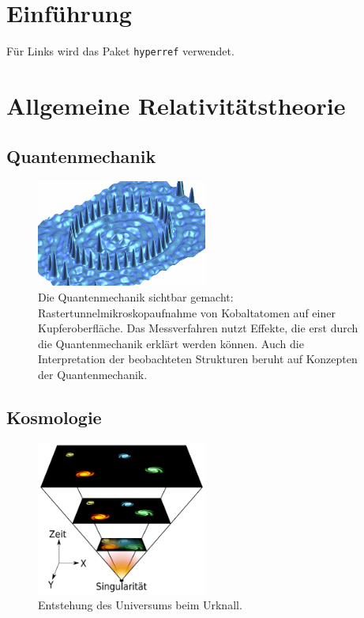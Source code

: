 \documentclass[a4paper, twoside, 10pt]{article}
\begin{document}
\section{Einführung}

F\"ur Links wird das Paket \texttt{hyperref} \cite{hyperref-doc} verwendet.

\lipsum

\section{Allgemeine Relativit\"atstheorie}

\lipsum

\subsection{Quantenmechanik}

\begin{figure}[htp]
    \centering
    \includegraphics[width=0.5\textwidth]{fig/co-ellipse.png}
    \caption{Die Quantenmechanik sichtbar gemacht: Rastertunnelmikroskopaufnahme von Kobaltatomen auf einer Kupferoberfläche. Das Messverfahren nutzt Effekte, die erst durch die Quantenmechanik erklärt werden können. Auch die Interpretation der beobachteten Strukturen beruht auf Konzepten der Quantenmechanik. \cite{fig-co-ellipse}}
    \label{fig:co-ellipse}
\end{figure}

\lipsum

\subsection{Kosmologie}

\begin{figure}[htp]
    \centering
    \includegraphics[width=0.5\textwidth]{fig/universe-expansion-de.png}
    \caption{Entstehung des Universums beim Urknall. \cite{fig-universe-expansion}}
    \label{fig:urknall}
\end{figure}
\end{document}
